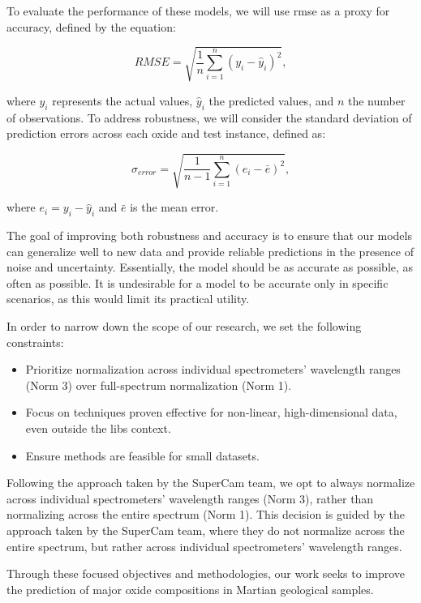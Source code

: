 To evaluate the performance of these models, we will use \gls{rmse} as a proxy for accuracy, defined by the equation:

\begin{equation}
    RMSE = \sqrt{\frac{1}{n} \sum_{i=1}^{n} (y_i - \hat{y}_i)^2},
\end{equation}

where $y_i$ represents the actual values, $\hat{y}_i$ the predicted values, and $n$ the number of observations.
To address robustness, we will consider the standard deviation of prediction errors across each oxide and test instance, defined as:

\begin{equation}
    \sigma_{error} = \sqrt{\frac{1}{n-1} \sum_{i=1}^{n} (e_i - \bar{e})^2},
\end{equation}

where $e_i = y_i - \hat{y}_i$ and $\bar{e}$ is the mean error.

The goal of improving both robustness and accuracy is to ensure that our models can generalize well to new data and provide reliable predictions in the presence of noise and uncertainty.
Essentially, the model should be as accurate as possible, as often as possible.
It is undesirable for a model to be accurate only in specific scenarios, as this would limit its practical utility.

In order to narrow down the scope of our research, we set the following constraints:
\begin{itemize}
    \item Prioritize normalization across individual spectrometers' wavelength ranges (Norm 3) over full-spectrum normalization (Norm 1).
    \item Focus on techniques proven effective for non-linear, high-dimensional data, even outside the \gls{libs} context.
    \item Ensure methods are feasible for small datasets.
\end{itemize}

Following the approach taken by the SuperCam team, we opt to always normalize across individual spectrometers' wavelength ranges (Norm 3), rather than normalizing across the entire spectrum (Norm 1).
This decision is guided by the approach taken by the SuperCam team, where they do not normalize across the entire spectrum, but rather across individual spectrometers' wavelength ranges\cite{andersonPostlandingMajorElement2022}.

Through these focused objectives and methodologies, our work seeks to improve the prediction of major oxide compositions in Martian geological samples.